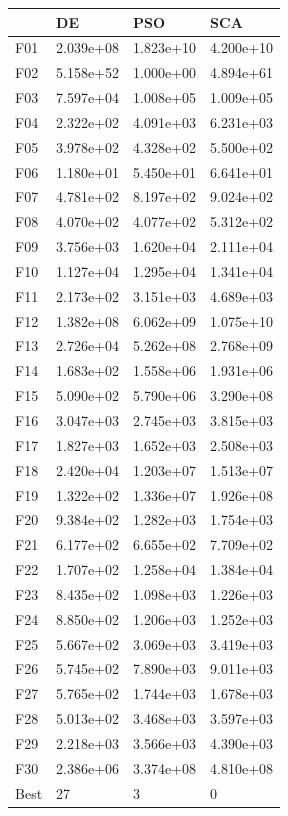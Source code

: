 \begin{tabular}{llll}
\toprule
{} &         DE &        PSO &        SCA \\
\midrule
F01  &  2.039e+08 &  1.823e+10 &  4.200e+10 \\
F02  &  5.158e+52 &  1.000e+00 &  4.894e+61 \\
F03  &  7.597e+04 &  1.008e+05 &  1.009e+05 \\
F04  &  2.322e+02 &  4.091e+03 &  6.231e+03 \\
F05  &  3.978e+02 &  4.328e+02 &  5.500e+02 \\
F06  &  1.180e+01 &  5.450e+01 &  6.641e+01 \\
F07  &  4.781e+02 &  8.197e+02 &  9.024e+02 \\
F08  &  4.070e+02 &  4.077e+02 &  5.312e+02 \\
F09  &  3.756e+03 &  1.620e+04 &  2.111e+04 \\
F10  &  1.127e+04 &  1.295e+04 &  1.341e+04 \\
F11  &  2.173e+02 &  3.151e+03 &  4.689e+03 \\
F12  &  1.382e+08 &  6.062e+09 &  1.075e+10 \\
F13  &  2.726e+04 &  5.262e+08 &  2.768e+09 \\
F14  &  1.683e+02 &  1.558e+06 &  1.931e+06 \\
F15  &  5.090e+02 &  5.790e+06 &  3.290e+08 \\
F16  &  3.047e+03 &  2.745e+03 &  3.815e+03 \\
F17  &  1.827e+03 &  1.652e+03 &  2.508e+03 \\
F18  &  2.420e+04 &  1.203e+07 &  1.513e+07 \\
F19  &  1.322e+02 &  1.336e+07 &  1.926e+08 \\
F20  &  9.384e+02 &  1.282e+03 &  1.754e+03 \\
F21  &  6.177e+02 &  6.655e+02 &  7.709e+02 \\
F22  &  1.707e+02 &  1.258e+04 &  1.384e+04 \\
F23  &  8.435e+02 &  1.098e+03 &  1.226e+03 \\
F24  &  8.850e+02 &  1.206e+03 &  1.252e+03 \\
F25  &  5.667e+02 &  3.069e+03 &  3.419e+03 \\
F26  &  5.745e+02 &  7.890e+03 &  9.011e+03 \\
F27  &  5.765e+02 &  1.744e+03 &  1.678e+03 \\
F28  &  5.013e+02 &  3.468e+03 &  3.597e+03 \\
F29  &  2.218e+03 &  3.566e+03 &  4.390e+03 \\
F30  &  2.386e+06 &  3.374e+08 &  4.810e+08 \\
Best &         27 &          3 &          0 \\
\bottomrule
\end{tabular}
